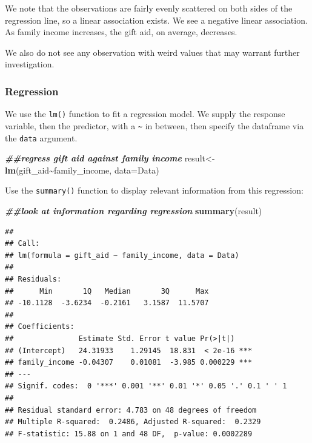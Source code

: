 \documentclass[
]{book}
\newenvironment{Shaded}{\begin{snugshade}}{\end{snugshade}}
\newcommand{\AttributeTok}[1]{\textcolor[rgb]{0.13,0.29,0.53}{#1}}
\newcommand{\DocumentationTok}[1]{\textcolor[rgb]{0.56,0.35,0.01}{\textbf{\textit{#1}}}}
\newcommand{\FunctionTok}[1]{\textcolor[rgb]{0.13,0.29,0.53}{\textbf{#1}}}
\newcommand{\NormalTok}[1]{#1}
\newcommand{\OtherTok}[1]{\textcolor[rgb]{0.56,0.35,0.01}{#1}}
\newcommand{\SpecialCharTok}[1]{\textcolor[rgb]{0.81,0.36,0.00}{\textbf{#1}}}
\begin{document}
We note that the observations are fairly evenly scattered on both sides of the regression line, so a linear association exists. We see a negative linear association. As family income increases, the gift aid, on average, decreases.

We also do not see any observation with weird values that may warrant further investigation.

\subsubsection*{Regression}\label{regression}

We use the \texttt{lm()} function to fit a regression model. We supply the response variable, then the predictor, with a \texttt{\textasciitilde{}} in between, then specify the dataframe via the \texttt{data} argument.

\begin{Shaded}
\begin{Highlighting}[]
\DocumentationTok{\#\#regress gift aid against family income}
\NormalTok{result}\OtherTok{\textless{}{-}}\FunctionTok{lm}\NormalTok{(gift\_aid}\SpecialCharTok{\textasciitilde{}}\NormalTok{family\_income, }\AttributeTok{data=}\NormalTok{Data)}
\end{Highlighting}
\end{Shaded}

Use the \texttt{summary()} function to display relevant information from this regression:

\begin{Shaded}
\begin{Highlighting}[]
\DocumentationTok{\#\#look at information regarding regression}
\FunctionTok{summary}\NormalTok{(result)}
\end{Highlighting}
\end{Shaded}

\begin{verbatim}
## 
## Call:
## lm(formula = gift_aid ~ family_income, data = Data)
## 
## Residuals:
##      Min       1Q   Median       3Q      Max 
## -10.1128  -3.6234  -0.2161   3.1587  11.5707 
## 
## Coefficients:
##               Estimate Std. Error t value Pr(>|t|)    
## (Intercept)   24.31933    1.29145  18.831  < 2e-16 ***
## family_income -0.04307    0.01081  -3.985 0.000229 ***
## ---
## Signif. codes:  0 '***' 0.001 '**' 0.01 '*' 0.05 '.' 0.1 ' ' 1
## 
## Residual standard error: 4.783 on 48 degrees of freedom
## Multiple R-squared:  0.2486, Adjusted R-squared:  0.2329 
## F-statistic: 15.88 on 1 and 48 DF,  p-value: 0.0002289
\end{verbatim}
\end{document}
